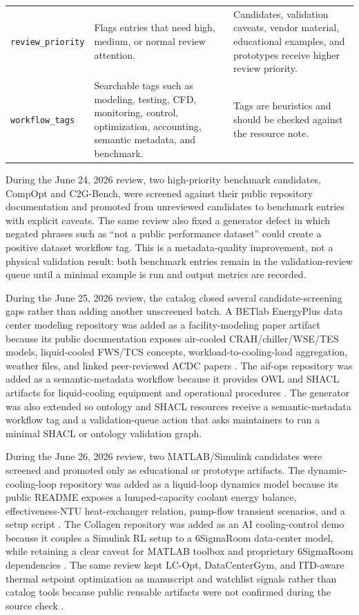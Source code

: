 \documentclass[11pt]{article}
\begin{document}
\begin{table}[t]
\begin{tabularx}{\textwidth}{p{}X X}
\addlinespace
\texttt{review\_priority} & Flags entries that need high, medium, or normal review attention. & Candidates, validation caveats, vendor material, educational examples, and prototypes receive higher review priority. \\
\addlinespace
\texttt{workflow\_tags} & Searchable tags such as modeling, testing, CFD, monitoring, control, optimization, accounting, semantic metadata, and benchmark. & Tags are heuristics and should be checked against the resource note. \\
\bottomrule
\end{tabularx}
\end{table}

During the June 24, 2026 review, two high-priority benchmark candidates, CompOpt and C2G-Bench, were screened against their public repository documentation and promoted from unreviewed candidates to benchmark entries with explicit caveats. The same review also fixed a generator defect in which negated phrases such as ``not a public performance dataset'' could create a positive dataset workflow tag. This is a metadata-quality improvement, not a physical validation result: both benchmark entries remain in the validation-review queue until a minimal example is run and output metrics are recorded.

During the June 25, 2026 review, the catalog closed several candidate-screening gaps rather than adding another unscreened batch. A BETlab EnergyPlus data center modeling repository was added as a facility-modeling paper artifact because its public documentation exposes air-cooled CRAH/chiller/WSE/TES models, liquid-cooled FWS/TCS concepts, workload-to-cooling-load aggregation, weather files, and linked peer-reviewed ACDC papers \cite{BETlabDataCenterModeling2026}. The aif-ops repository was added as a semantic-metadata workflow because it provides OWL and SHACL artifacts for liquid-cooling equipment and operational procedures \cite{VisumAIFOps2026}. The generator was also extended so ontology and SHACL resources receive a semantic-metadata workflow tag and a validation-queue action that asks maintainers to run a minimal SHACL or ontology validation graph.

During the June 26, 2026 review, two MATLAB/Simulink candidates were screened and promoted only as educational or prototype artifacts. The dynamic-cooling-loop repository was added as a liquid-loop dynamics model because its public README exposes a lumped-capacity coolant energy balance, effectiveness-NTU heat-exchanger relation, pump-flow transient scenarios, and a setup script \cite{SamruditionDynamicCoolingLoop2026}. The Collagen repository was added as an AI cooling-control demo because it couples a Simulink RL setup to a 6SigmaRoom data-center model, while retaining a clear caveat for MATLAB toolbox and proprietary 6SigmaRoom dependencies \cite{CollagenCooling2026}. The same review kept LC-Opt, DataCenterGym, and ITD-aware thermal setpoint optimization as manuscript and watchlist signals rather than catalog tools because public reusable artifacts were not confirmed during the source check \cite{NaugLCOpt2025,PathakDataCenterGym2026,CropITD2026}.
\end{document}
